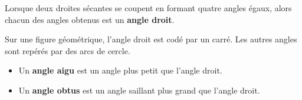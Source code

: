 \newpage

\begin{Définition*}
\begin{minipage}[c]{0.7\textwidth}
Lorsque deux droites sécantes se coupent en formant quatre angles égaux, alors chacun des angles obtenus est un \textbf{angle droit}.
\end{minipage} \hfill
\begin{minipage}[c]{0.3\textwidth}
\begin{center}
\end{center}
\end{minipage}
\end{Définition*}

\begin{Notation}
Sur une figure géométrique, l'angle droit est codé par un carré. Les autres angles sont repérés par des arcs de cercle.
\end{Notation}

\begin{Définitions*}[c]
\begin{minipage}[c]{0.7\textwidth}
\begin{itemize}[label=\textcolor{Couleur6}{$\bullet$}]
\item Un \textbf{angle aigu} est un angle plus petit que l'angle droit.
\item Un \textbf{angle obtus} est un angle saillant plus grand que l'angle droit.
\end{itemize}
\end{minipage} \hfill
\begin{minipage}[c]{0.3\textwidth}
\begin{center}
\end{center}
\end{minipage}
\end{Définitions*}





